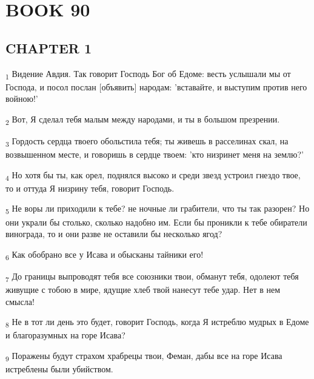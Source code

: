 \section{BOOK 90}
\subsection{CHAPTER 1}
\begin{tcolorbox}
\textsubscript{1} Видение Авдия. Так говорит Господь Бог об Едоме: весть услышали мы от Господа, и посол послан [объявить] народам: 'вставайте, и выступим против него войною!'
\end{tcolorbox}
\begin{tcolorbox}
\textsubscript{2} Вот, Я сделал тебя малым между народами, и ты в большом презрении.
\end{tcolorbox}
\begin{tcolorbox}
\textsubscript{3} Гордость сердца твоего обольстила тебя; ты живешь в расселинах скал, на возвышенном месте, и говоришь в сердце твоем: 'кто низринет меня на землю?'
\end{tcolorbox}
\begin{tcolorbox}
\textsubscript{4} Но хотя бы ты, как орел, поднялся высоко и среди звезд устроил гнездо твое, то и оттуда Я низрину тебя, говорит Господь.
\end{tcolorbox}
\begin{tcolorbox}
\textsubscript{5} Не воры ли приходили к тебе? не ночные ли грабители, что ты так разорен? Но они украли бы столько, сколько надобно им. Если бы проникли к тебе обиратели винограда, то и они разве не оставили бы несколько ягод?
\end{tcolorbox}
\begin{tcolorbox}
\textsubscript{6} Как обобрано все у Исава и обысканы тайники его!
\end{tcolorbox}
\begin{tcolorbox}
\textsubscript{7} До границы выпроводят тебя все союзники твои, обманут тебя, одолеют тебя живущие с тобою в мире, ядущие хлеб твой нанесут тебе удар. Нет в нем смысла!
\end{tcolorbox}
\begin{tcolorbox}
\textsubscript{8} Не в тот ли день это будет, говорит Господь, когда Я истреблю мудрых в Едоме и благоразумных на горе Исава?
\end{tcolorbox}
\begin{tcolorbox}
\textsubscript{9} Поражены будут страхом храбрецы твои, Феман, дабы все на горе Исава истреблены были убийством.
\end{tcolorbox}

